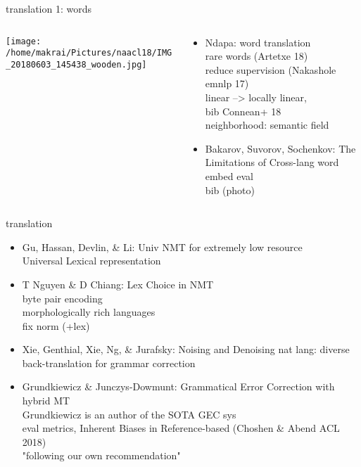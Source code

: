 \documentclass{beamer}
\begin{document}
\begin{frame}{translation 1: words}
\begin{columns}\begin{column}{.35\textwidth}\centering \texttt{[image: /home/makrai/Pictures/naacl18/IMG\_20180603\_145438\_wooden.jpg]}\end{column}\begin{column}{.65\textwidth}
  \begin{itemize} 
    \item Ndapa: word translation
      \\ rare words (Artetxe 18)
      \\ reduce supervision (Nakashole emnlp 17)
      \\ linear --> locally linear,
      \\ bib Connean+ 18
      \\ neighborhood: semantic field
    \item Bakarov, Suvorov, Sochenkov: The Limitations of Cross-lang word embed eval 
      \\ bib (photo)
  \end{itemize}
\end{column}\end{columns}
\end{frame}
\begin{frame}{translation}
  \begin{itemize}
    \item Gu, Hassan, Devlin, \& Li: Univ NMT for extremely low resource 
      \\ Universal Lexical representation
    \item T Nguyen \& D Chiang: Lex Choice in NMT 
      \\ byte pair encoding 
      \\ morphologically rich languages
      \\ fix norm (+lex)
    \item Xie, Genthial, Xie, Ng, \& Jurafsky: Noising and Denoising nat lang: 
      diverse back-translation for grammar correction
    \item Grundkiewicz \& Junczys-Dowmunt: Grammatical Error Correction with hybrid MT
      \\ Grundkiewicz is an author of the SOTA GEC sys
      \\ eval metrics, Inherent Biases in Reference-based (Choshen \& Abend ACL 2018)
      \\ "following our own recommendation"
  \end{itemize}
\end{frame}
\end{document}
